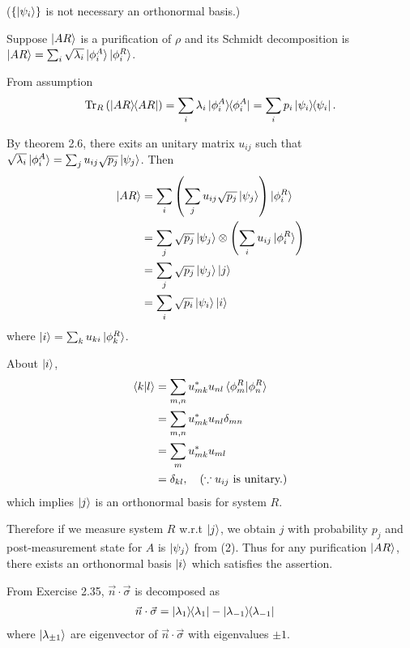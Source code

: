 ($\{ \ket{\psi_i} \}$ is not necessary an orthonormal basis.)


Suppose $\ket{AR}$ is a purification of $\rho$ and its Schmidt decomposition is $\ket{AR} = \sum_i \sqrt{\lambda_i} \ket{\phi_i^A} \ket{\phi_i^R}$.

From assumption
\begin{align*}
    \operatorname{Tr}_R \left( \ket{AR}\hspace{-1mm} \bra{AR} \right) = \sum_i \lambda_i \ket{\phi_i^A}\hspace{-1mm} \bra{\phi_i^A} = \sum_i p_i \ket{\psi_i}\hspace{-1mm} \bra{\psi_i}.
\end{align*}

By theorem 2.6, there exits an unitary matrix $u_{ij}$ such that $\sqrt{\lambda_i}\ket{\phi_i^A} = \sum_j u_{ij} \sqrt{p_j} \ket{\psi_j}$.
Then
\begin{align*}
    \ket{AR} &= \sum_i \left( \sum_j u_{ij} \sqrt{p_j} \ket{\psi_j} \right) \ket{\phi_i^R}\\
             &= \sum_j \sqrt{p_j} \ket{\psi_j} \otimes\left( \sum_i u_{ij} \ket{\phi_i^R} \right)\\
             &= \sum_j \sqrt{p_j} \ket{\psi_j} \ket{j}\\
             &= \sum_i \sqrt{p_i} \ket{\psi_i} \ket{i}
\end{align*}
where $\ket{i} = \sum_k u_{ki} \ket{\phi_k^R}$.

About $\ket{i}$,
\begin{align*}
    \braket{k | l} &= \sum_{m,n} u_{mk}^* u_{nl} \braket{\phi_m^R | \phi_n^R }\\
        &= \sum_{m,n} u_{mk}^* u_{nl} \delta_{mn}\\
        &= \sum_m u_{mk}^* u_{ml}\\
        &= \delta_{kl}, ~~~(\because u_{ij} \text{ is unitary.})
\end{align*}
which implies $\ket{j}$ is an orthonormal basis for system $R$.

Therefore if we measure system $R$ w.r.t $\ket{j}$, we obtain $j$ with probability $p_j$ and post-measurement state for $A$ is $\ket{\psi_j}$ from (2).
Thus for any purification $\ket{AR}$, there exists an orthonormal basis $\ket{i}$ which satisfies the assertion.



From Exercise 2.35, $\vec{n} \cdot \vec{\sigma}$ is decomposed as
\begin{align*}
	\vec{n} \cdot \vec{\sigma} &= \ket{\lambda_1}\hspace{-1mm} \bra{\lambda_1} - \ket{\lambda_{-1}}\hspace{-1mm} \bra{\lambda_{-1}}
\end{align*}
where $\ket{\lambda_{\pm 1}}$ are eigenvector of $\vec{n} \cdot \vec{\sigma}$ with eigenvalues $\pm 1$.

